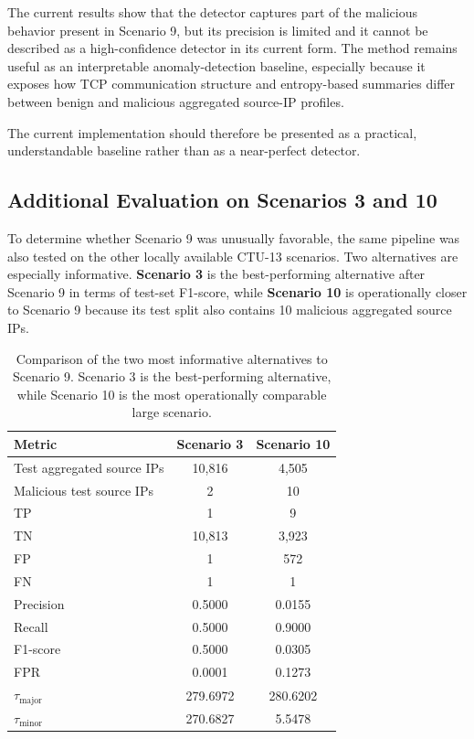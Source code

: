 \documentclass{article}
\begin{document}
The current results show that the detector captures part of the malicious behavior present in Scenario 9, but its precision is limited and it cannot be described as a high-confidence detector in its current form. The method remains useful as an interpretable anomaly-detection baseline, especially because it exposes how TCP communication structure and entropy-based summaries differ between benign and malicious aggregated source-IP profiles.

The current implementation should therefore be presented as a practical, understandable baseline rather than as a near-perfect detector.

\subsection{Additional Evaluation on Scenarios 3 and 10}

To determine whether Scenario 9 was unusually favorable, the same pipeline was also tested on the other locally available CTU-13 scenarios. Two alternatives are especially informative. \textbf{Scenario 3} is the best-performing alternative after Scenario 9 in terms of test-set F1-score, while \textbf{Scenario 10} is operationally closer to Scenario 9 because its test split also contains 10 malicious aggregated source IPs.

\begin{table}[h]
\centering
\small
\begin{tabular}{lcc}
\toprule
\textbf{Metric} & \textbf{Scenario 3} & \textbf{Scenario 10} \\
\midrule
Test aggregated source IPs & 10{,}816 & 4{,}505 \\
Malicious test source IPs  & 2        & 10 \\
TP                         & 1        & 9 \\
TN                         & 10{,}813 & 3{,}923 \\
FP                         & 1        & 572 \\
FN                         & 1        & 1 \\
\midrule
Precision                  & 0.5000   & 0.0155 \\
Recall                     & 0.5000   & 0.9000 \\
F1-score                   & 0.5000   & 0.0305 \\
FPR                        & 0.0001   & 0.1273 \\
$\tau_{\text{major}}$      & 279.6972 & 280.6202 \\
$\tau_{\text{minor}}$      & 270.6827 & 5.5478 \\
\bottomrule
\end{tabular}
\caption{Comparison of the two most informative alternatives to Scenario 9. Scenario 3 is the best-performing alternative, while Scenario 10 is the most operationally comparable large scenario.}
\label{tab:metrics_scenario3_10}
\end{table}
\end{document}
